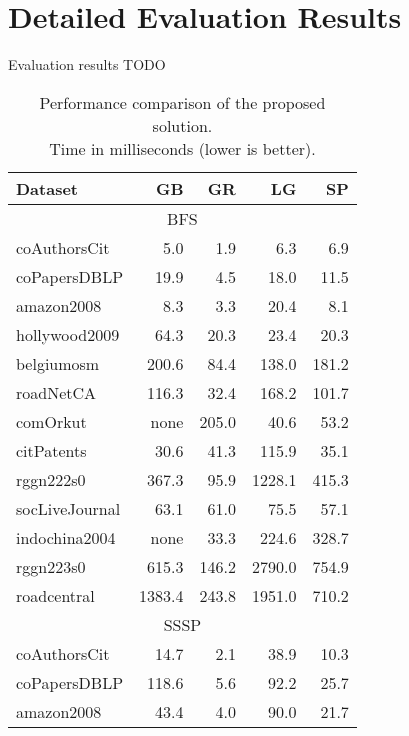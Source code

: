 \section{Detailed Evaluation Results}

Evaluation results TODO

\begin{table}[tbp]
    \caption{Performance comparison of the proposed solution.\\Time in milliseconds (lower is better).} 
    \begin{center}
        \begin{tabular}{|l|r|r|r|r|}
        \hline
        Dataset & GB & GR & LG & SP \\
        \hline
        \hline
        \multicolumn{5}{|c|}{BFS} \\
        \hline
        \rowcolor{black!10} coAuthorsCit&5.0&1.9&6.3&6.9\\
        \rowcolor{black!2 } coPapersDBLP&19.9&4.5&18.0&11.5\\
        \rowcolor{black!10} amazon2008&8.3&3.3&20.4&8.1\\
        \rowcolor{black!2 } hollywood2009&64.3&20.3&23.4&20.3\\
        \rowcolor{black!10} belgiumosm&200.6&84.4&138.0&181.2\\
        \rowcolor{black!2 } roadNetCA&116.3&32.4&168.2&101.7\\
        \rowcolor{black!10} comOrkut& none&205.0&40.6&53.2\\
        \rowcolor{black!2 } citPatents&30.6&41.3&115.9&35.1\\
        \rowcolor{black!10} rggn222s0&367.3&95.9&1228.1&415.3\\
        \rowcolor{black!2 } socLiveJournal&63.1&61.0&75.5&57.1\\
        \rowcolor{black!10} indochina2004& none&33.3&224.6&328.7\\
        \rowcolor{black!2 } rggn223s0&615.3&146.2&2790.0&754.9\\
        \rowcolor{black!10} roadcentral&1383.4&243.8&1951.0&710.2\\
        \hline
        \hline
        \multicolumn{5}{|c|}{SSSP} \\
        \hline
        \rowcolor{black!10} coAuthorsCit&14.7&2.1&38.9&10.3\\
        \rowcolor{black!2 } coPapersDBLP&118.6&5.6&92.2&25.7\\
        \rowcolor{black!10} amazon2008&43.4&4.0&90.0&21.7\\

\end{tabular}
\end{center}
\end{table}
